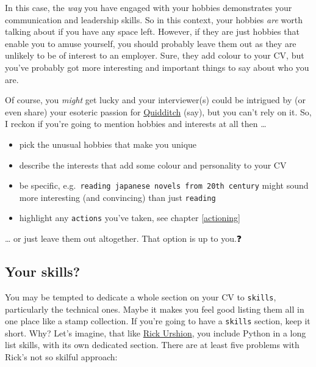 \documentclass[
]{book}
\providecommand{\tightlist}{%
  \setlength{\itemsep}{0pt}\setlength{\parskip}{0pt}}
\begin{document}
In this case, the \emph{way} you have engaged with your hobbies demonstrates your communication and leadership skills. So in this context, your hobbies \emph{are} worth talking about if you have any space left. However, if they are just hobbies that enable you to amuse yourself, you should probably leave them out as they are unlikely to be of interest to an employer. Sure, they add colour to your CV, but you've probably got more interesting and important things to say about who you are.

Of course, you \emph{might} get lucky and your interviewer(s) could be intrigued by (or even share) your esoteric passion for \href{https://en.wikipedia.org/wiki/Quidditch_(real-life_sport)}{Quidditch} (say), but you can't rely on it. So, I reckon if you're going to mention hobbies and interests at all then \ldots{}

\begin{itemize}
\tightlist
\item
  pick the unusual hobbies that make you unique
\item
  describe the interests that add some colour and personality to your CV
\item
  be specific, e.g.~\texttt{reading\ japanese\ novels\ from\ 20th\ century} might sound more interesting (and convincing) than just \texttt{reading}
\item
  highlight any \texttt{actions} you've taken, see chapter \ref{actioning}
\end{itemize}

\ldots{} or just leave them out altogether. That option is up to you.❓

\hypertarget{mycvsk}{%
\subsection{Your skills?}\label{mycvsk}}

You may be tempted to dedicate a whole section on your CV to \texttt{skills}, particularly the technical ones. Maybe it makes you feel good listing them all in one place like a stamp collection. If you're going to have a \texttt{skills} section, keep it short. Why? Let's imagine, that like \href{Rick_Urshion.pdf}{Rick Urshion}, you include Python in a long list skills, with its own dedicated section. There are at least five problems with Rick's not so skilful approach:
\end{document}

